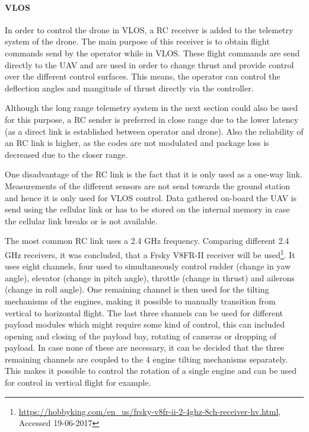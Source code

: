 
\paragraph{VLOS}

In order to control the drone in VLOS, a RC receiver is added to the telemetry system of the drone. The main purpose of this receiver is to obtain flight commands send by the operator while in VLOS. These flight commands are send directly to the UAV and are used in order to change thrust and provide control over the different control surfaces. This means, the operator can control the deflection angles and mangitude of thrust directly via the controller. 

Although the long range telemetry system in the next section could also be used for this purpose, a RC sender is preferred in close range due to the lower latency (as a direct link is established between operator and drone). Also the reliability of an RC link is higher, as the codes are not modulated and package loss is decreased due to the closer range.     

One disadvantage of the RC link is the fact that it is only used as a one-way link. Measurements of the different sensors are not send towards the ground station and hence it is only used for VLOS control. Data gathered on-board the UAV is send using the cellular link or has to be stored on the internal memory in case the cellular link breaks or is not available.

The most common RC link uses a 2.4 GHz frequency. Comparing different 2.4 GHz receivers, it was concluded, that a Frsky V8FR-II receiver will be used\footnote{\url{https://hobbyking.com/en_us/frsky-v8fr-ii-2-4ghz-8ch-receiver-hv.html}, Accessed 19-06-2017}. It uses eight channels, four used to simultaneously control rudder (change in yaw angle), elevator (change in pitch angle), throttle (change in thrust) and ailerons (change in roll angle). One remaining channel is then used for the tilting mechanisms of the engines, making it possible to manually transition from vertical to horizontal flight. The last three channels can be used for different payload modules which might require some kind of control, this can included opening and closing of the payload bay, rotating of cameras or dropping of payload. In case none of these are necessary, it can be decided that the three remaining channels are coupled to the 4 engine tilting mechanisms separately. This makes it possible to control the rotation of a single engine and can be used for control in vertical flight for example.



